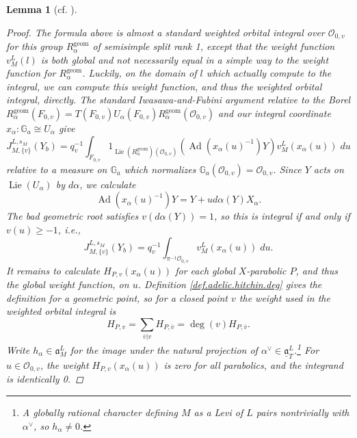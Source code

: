 \documentclass[openany]{amsbook}
\newtheorem{lemma}[theorem]{Lemma}
\theoremstyle{definition}
\theoremstyle{remark}
\numberwithin{equation}{section}
\newcommand{\G}{\mathbb{G}}
\renewcommand{\O}{\mathcal{O}}
\newcommand{\ol}[1]{\overline{#1}}
\newcommand{\ul}[1]{\underline{#1}}
\renewcommand{\-}{\operatorname{-}}
\renewcommand{\a}{\mathfrak{a}}
\newcommand{\on}[1]{\operatorname{#1}}
\newcommand{\Lie}{\on{Lie}}
\newcommand{\Ad}{\on{Ad}}
\newcommand{\ga}{\ul{\a}}
\begin{document}
\begin{lemma}[{cf. \cite[Lemme 17.6.2, Lemme 17.8.1]{CLII}}]
\begin{proof}
        The formula above is almost a standard weighted orbital integral over $\O_{0,v}$ for this group $R_{\alpha}^{\on{geom}}$ of semisimple split rank 1, except that the weight function $v_{M}^L(l)$ is both global and not necessarily equal in a simple way to the weight function for $R_{\alpha}^{\on{geom}}$. Luckily, on the domain of $l$ which actually compute to the integral, we can compute this weight function, and thus the weighted orbital integral, directly. The standard Iwasawa-and-Fubini argument relative to the Borel $R_\alpha^{\on{geom}}(F_{0,v}) = T(F_{0,v}) U_\alpha(F_{0,v}) R_\alpha^{\on{geom}}(\O_{0,v})$ and our integral coordinate $x_\alpha : \G_a \cong U_\alpha$ give
        $$
            J_{M,\{v\}}^{L, s_M}(Y_b) = q_v^{-1} \int_{F_{0,v}} 1_{\Lie(R_{\alpha}^{\on{geom}})(\O_{0,v})}(\Ad(x_\alpha(u)^{-1}) Y) v_M^L(x_\alpha(u)) \; du
        $$
        relative to a measure on $\G_a$ which normalizes $\G_a(\O_{0,v}) = \O_{0,v}$. Since $Y$ acts on $\Lie(U_\alpha)$ by $d\alpha$, we calculate
        $$
            \Ad(x_\alpha(u)^{-1}) Y = Y + u d\alpha(Y) X_\alpha.
        $$
        The bad geometric root satisfies $v(d\alpha(Y)) = 1$, so this is integral if and only if $v(u) \ge -1$, i.e.,
        $$
            J_{M,\{v\}}^{L, s_M}(Y_b) = q_v^{-1} \int_{\pi^{-1} \O_{0,v}} v_M^L(x_\alpha(u)) \; du.
        $$
        It remains to calculate $H_{P,v}(x_\alpha(u))$ for each global $X$-parabolic $P$, and thus the global weight function, on $u$. Definition \ref{def.adelic.hitchin.deg} gives the definition for a geometric point, so for a closed point $v$ the weight used in the weighted orbital integral is
        $$
            H_{P,v} = \sum_{\ol{v}|v} H_{P, \ol{v}} = \deg(v) H_{P, \ol{v}}.
        $$
        Write $h_\alpha \in \a_M^L$ for the image under the natural projection of $\alpha^\vee \in \ga_T^L$.\footnote{A globally rational character defining $M$ as a Levi of $L$ pairs nontrivially with $\alpha^\vee$, so $h_\alpha \neq 0$.} For $u \in \O_{0,v}$, the weight $H_{P,v}(x_\alpha(u))$ is zero for all parabolics, and the integrand is identically 0. 
        

\end{proof}
\end{lemma}
\end{document}
